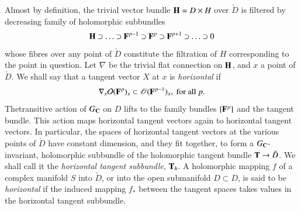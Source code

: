 Almost by definition, the trivial vector bundle $\mathbf{H} = D \times H$ over $\check{D}$ is filtered by decreasing family of holomorphic subbundles
$$
\mathbf{H} \supset \ldots \supset \mathbf{F}^{p-1} \supset \mathbf{F}^p \supset \mathbf{F}^{p+1} \supset \ldots \supset 0
$$
whose fibres over any point of $\check{D}$ constitute the filtration of $H$ corresponding to the point in question. Let $\nabla$ be the trivial flat connection on $\mathbf{H}$, and $x$ a point of $\check{D}$. We shall say that a tangent vector $X$ at $x$ is \textit{horizontal} if
\begin{equation}
\nabla_x \mathcal{O} (\mathbf{F}^p)_x \subset \mathscr{O} (\mathbf{F}^{p-1})_x, \text{ for all } p. \label{art4-eq3.6}
\end{equation}
The\pageoriginale transitive action of $G_{\mathbf{C}}$ on $D$ lifts to the family bundles $\{\mathbf{F}^p\}$ and the tangent bundle. This action maps horizontal tangent vectors again to horizontal tangent vectors. In particular, the spaces of horizontal tangent vectors at the various points of $\check{D}$ have constant dimension, and they fit together, to form a $G_{\mathbf{C}}$-invariant, holomorphic subbundle of the holomorphic tangent bundle $\mathbf{T} \to \check{D}$. We shall call it the \textit{horizontal tangent subbundle}, $\mathbf{T}_h$. A holomorphic mapping $f$ of a complex manifold $S$ into $\check{D}$, or into the open submanifold $D \subset D$, is said to be \textit{horizontal} if the induced mapping $f_{\ast}$ between the tangent spaces takes values in the horizontal tangent subbundle.

